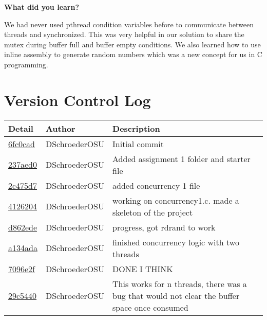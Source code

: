 \documentclass[10pt,letterpaper,draftclsnofoot,onecolumn]{IEEEtran}
\begin{document}
\bigskip

\noindent\textbf{What did you learn?}
\medskip

\noindent We had never used pthread condition variables before to communicate between threads and synchronized. This was very helpful in our solution to share the mutex during buffer full and buffer empty conditions. We also learned how to use inline assembly to generate random numbers which was a new concept for us in C programming.\par
\bigskip

\section{Version Control  Log}
\bigskip

\noindent\begin{tabular}{l l l}\textbf{Detail} & \textbf{Author} & \textbf{Description}\\\hline
\href{https://github.com/DSchroederOSU/CS444-Group\_11\_05/commit/6fc0cad45a2a515f54c120fa6d411cbb62a0eed5}{6fc0cad} & DSchroederOSU & Initial commit\\\hline
\href{https://github.com/DSchroederOSU/CS444-Group\_11\_05/commit/237aed09afe1e61e9421f419164f4d41387adddd}{237aed0} & DSchroederOSU & Added assignment 1 folder and starter file\\\hline
\href{https://github.com/DSchroederOSU/CS444-Group\_11\_05/commit/2c475d7e15d1a54406c275a2a27c5df472c46ded}{2c475d7} & DSchroederOSU & added concurrency 1 file\\\hline
\href{https://github.com/DSchroederOSU/CS444-Group\_11\_05/commit/4126204c49cd2e10090eb4d6bd3183bc23c94648}{4126204} & DSchroederOSU & working on concurrency1.c. made a skeleton of the project\\\hline
\href{https://github.com/DSchroederOSU/CS444-Group\_11\_05/commit/d862edec54dd0eb51bdde6e26337315a2675d434}{d862ede} & DSchroederOSU & progress, got rdrand to work\\\hline
\href{https://github.com/DSchroederOSU/CS444-Group\_11\_05/commit/a134adaeeff0b0ebc7bc662d809edc973ab6f841}{a134ada} & DSchroederOSU & finished concurrency logic with two threads\\\hline
\href{https://github.com/DSchroederOSU/CS444-Group\_11\_05/commit/7096e2f214d8f164dcf02c58d8924f903281e867}{7096e2f} & DSchroederOSU & DONE I THINK\\\hline
\href{https://github.com/DSchroederOSU/CS444-Group\_11\_05/commit/29c5440b4d14c3656d11c907e8794f6f08d98897}{29c5440} & DSchroederOSU & This works for n threads, there was a bug that would not clear the buffer space once consumed\\\hline

\end{tabular}
\end{document}
